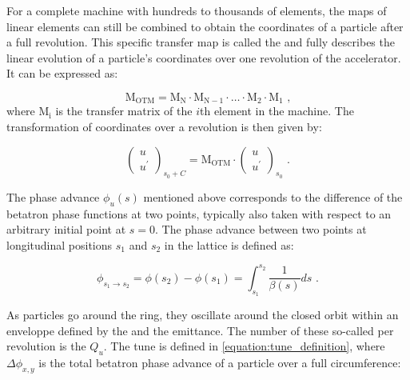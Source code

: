 For a complete machine with hundreds to thousands of elements, the maps of linear elements can still be combined to obtain the coordinates of a particle after a full revolution.
This specific transfer map is called the  and fully describes the linear evolution of a particle's coordinates over one revolution of the accelerator.
It can be expressed as:

\begin{equation}
    \mathrm{M_{OTM}} = \mathrm{M_N} \cdot \mathrm{M_{N-1}} \cdot \ldots \cdot \mathrm{M_2} \cdot \mathrm{M_1} \text{ ,}
    \label{equation:one_turn_map}
\end{equation}
where \(\mathrm{M_i}\) is the transfer matrix of the \(i\)th element in the machine.
The transformation of coordinates over a revolution is then given by:

\begin{equation}
    \left(
        \begin{array}{c}
            u \\
            u^{\prime}
        \end{array} \right)_{s_0 + C} = \mathrm{M_{OTM}} \cdot \left( 
        \begin{array}{c}
            u \\
            u^{\prime}
    \end{array} \right)_{s_0} \text{ .}
    \label{equation:one_turn_coordinates_transformation}
\end{equation}

The phase advance \(\phi_u(s)\) mentioned above corresponds to the difference of the betatron phase functions at two points, typically also taken with respect to an arbitrary initial point at \(s = 0\).
The phase advance between two points at longitudinal positions \(s_1\) and \(s_2\) in the lattice is defined as:

\begin{equation}
    \phi_{s_1 \rightarrow s_2} = \phi(s_{2}) - \phi(s_{1}) = \int_{s_{1}}^{s_{2}} \frac{1}{\beta(s)} ds \text{ .}
    \label{equation:phase_advance_definition}
\end{equation}

As particles go around the ring, they oscillate around the closed orbit within an enveloppe defined by the \betafunctions and the emittance.
The number of these so-called  per revolution is the  \(Q_u\).
The tune is defined in \cref{equation:tune_definition}, where \(\Delta \phi_{x, y}\) is the total betatron phase advance of a particle over a full circumference:

